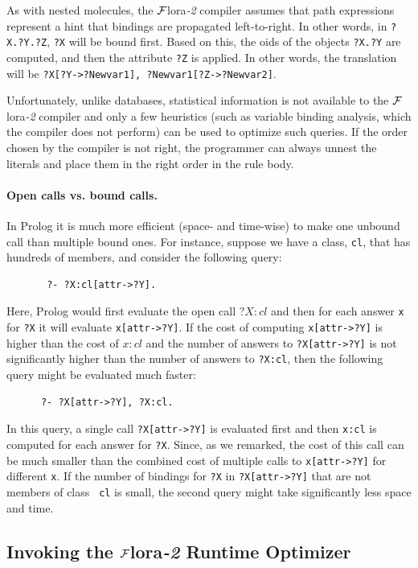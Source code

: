 \documentclass[11pt]{article}
\newcommand{\FLORA}{{\mbox{\sc ${\cal F}${lora}\rm\emph{-2}}}\xspace}
\begin{document}
As with nested molecules, the \FLORA compiler assumes that path
expressions represent a hint that bindings are propagated left-to-right.
In other words, in {\tt ?X.?Y.?Z}, {\tt ?X} will be bound first.
Based on this, the oids of the objects {\tt ?X.?Y} are computed, and
then the attribute {\tt ?Z} is applied. In other words, the translation will
be {\tt ?X[?Y->?Newvar1], ?Newvar1[?Z->?Newvar2]}.

Unfortunately, unlike databases, statistical information is not
available to the \FLORA compiler and only a few heuristics (such as
variable binding analysis, which the compiler does not perform) can be used
to optimize such queries. If the order chosen by the compiler is not right,
the programmer can always unnest the literals and place them in the right
order in the rule body.

\paragraph{Open calls vs. bound calls.}
In Prolog it is much more efficient (space- and
time-wise) to make one unbound call than multiple bound ones. For instance,
suppose we have a class, {\tt cl}, that has hundreds of members, and
consider the following query:
\begin{verbatim}
       ?- ?X:cl[attr->?Y].  
\end{verbatim}
Here, Prolog would first evaluate the open call $?X:cl$ and then for each
answer {\tt x} for {\tt ?X} it will evaluate {\tt x[attr->?Y]}.
If the cost of computing {\tt x[attr->?Y]} is higher than the cost of $x:cl$
and the number of answers to {\tt ?X[attr->?Y]} is not significantly
higher than the number of answers to {\tt ?X:cl}, then the following query
might be evaluated much faster:
\begin{verbatim}
      ?- ?X[attr->?Y], ?X:cl.  
\end{verbatim}
In this query, a single call {\tt ?X[attr->?Y]} is evaluated first and then
{\tt x:cl} is computed for each answer for {\tt ?X}.  Since, as we remarked,
the cost of this call can be much smaller than the combined cost of
multiple calls to {\tt x[attr->?Y]} for different {\tt x}.  If the number of
bindings for {\tt ?X} in {\tt ?X[attr->?Y]} that are not members of class {\tt
  cl} is small, the second query might take significantly less space and
time.

\subsection{Invoking the \FLORA Runtime Optimizer}
\label{sec-runtime-optimizer}
\end{document}
